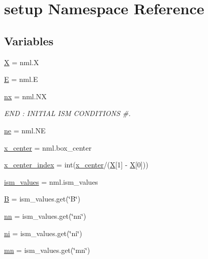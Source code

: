 \hypertarget{namespacesetup}{}\section{setup Namespace Reference}
\label{namespacesetup}
\subsection*{Variables}
\begin{DoxyCompactItemize}
\item 
\hyperlink{namespacesetup_a0d71901ea06bb31a1b5e9e742158486f}{X} = nml.\+X
\item 
\hyperlink{namespacesetup_a8bf3113e27e2925ec3309507c6d5ebf2}{E} = nml.\+E
\item 
\hyperlink{namespacesetup_acdd28dabaab21c1904ea9382e5f6a8db}{nx} = nml.\+NX
\begin{DoxyCompactList}\small\item\em E\+ND \+: I\+N\+I\+T\+I\+AL I\+SM C\+O\+N\+D\+I\+T\+I\+O\+NS \#. \end{DoxyCompactList}\item 
\hyperlink{namespacesetup_ac05943ff8cb3a75793d6458785d0a79f}{ne} = nml.\+NE
\item 
\hyperlink{namespacesetup_a995201ad997d1a878ac4993acf76bab4}{x\+\_\+center} = nml.\+box\+\_\+center
\item 
\hyperlink{namespacesetup_a9a740cd3a2b0dd50e64afd7b8be31573}{x\+\_\+center\+\_\+index} = int(\hyperlink{namespacesetup_a995201ad997d1a878ac4993acf76bab4}{x\+\_\+center}/(\hyperlink{namespacesetup_a0d71901ea06bb31a1b5e9e742158486f}{X}\mbox{[}1\mbox{]} -\/ \hyperlink{namespacesetup_a0d71901ea06bb31a1b5e9e742158486f}{X}\mbox{[}0\mbox{]}))
\item 
\hyperlink{namespacesetup_ae9743eacdcbd49599d43d5f99093a3d7}{ism\+\_\+values} = nml.\+ism\+\_\+values
\item 
\hyperlink{namespacesetup_a42412341b3814520bda92b5c86b66e3a}{B} = ism\+\_\+values.\+get(\char`\"{}B\char`\"{})
\item 
\hyperlink{namespacesetup_a26490aaba8991b0c3889206244da6ebf}{nn} = ism\+\_\+values.\+get(\char`\"{}nn\char`\"{})
\item 
\hyperlink{namespacesetup_ad9ce8bcb8e2c0ccab520d9f110ea46a7}{ni} = ism\+\_\+values.\+get(\char`\"{}ni\char`\"{})
\item 
\hyperlink{namespacesetup_ab6d825a594786f92a8bc65116ef2f721}{mn} = ism\+\_\+values.\+get(\char`\"{}mn\char`\"{})
\item 

\end{DoxyCompactItemize}
